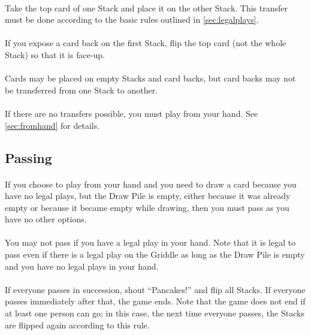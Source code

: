 \documentclass{article}
\begin{document}
\paragraph{}
Take the top card of one Stack and place it on the other Stack. This transfer must be done according to the basic rules outlined in \autoref{sec:legalplays}.

\paragraph{}
If you expose a card back on the first Stack, flip the top card (not the whole Stack) so that it is face-up.

\paragraph{}
Cards may be placed on empty Stacks and card backs, but card backs may not be transferred from one Stack to another.

\paragraph{}
If there are no transfers possible, you must play from your hand. See \autoref{sec:fromhand} for details.

\subsection{Passing}

\paragraph{}
If you choose to play from your hand and you need to draw a card because you have no legal plays, but the Draw Pile is empty, either because it was already empty or because it became empty while drawing, then you must pass as you have no other options.

\paragraph{}
You may not pass if you have a legal play in your hand. Note that it is legal to pass even if there is a legal play on the Griddle as long as the Draw Pile is empty and you have no legal plays in your hand.

\paragraph{}
If everyone passes in succession, shout ``Pancakes!'' and flip all Stacks. If everyone passes immediately after that, the game ends. Note that the game does not end if at least one person can go; in this case, the next time everyone passes, the Stacks are flipped again according to this rule.
\end{document}
